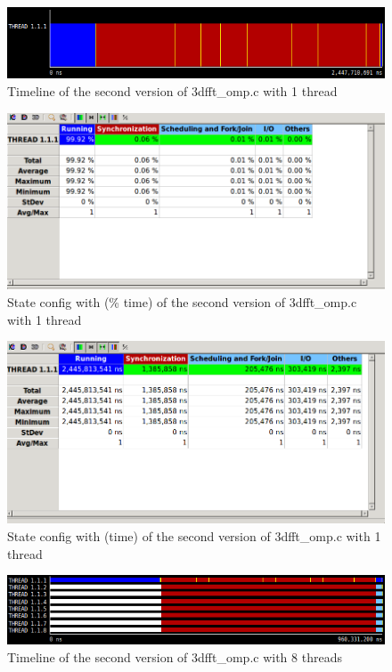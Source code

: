 \documentclass[12]{article}
\begin{document}
\bigskip

\begin{figure}[H]
\centering  
\includegraphics[scale=0.5]{images/improved_3dfft/1threadTimeline.PNG}
    \caption{Timeline of the second version of 3dfft\_omp.c with 1 thread}
\end{figure}

\begin{figure}[H]
\centering  
\includegraphics[scale=0.5]{images/improved_3dfft/1threadPercentage.PNG}
    \caption{State config with (\% time) of the second version of 3dfft\_omp.c with 1 thread}
\end{figure}

\begin{figure}[H]
\centering  
\includegraphics[scale=0.5]{images/improved_3dfft/1thread.PNG}
    \caption{State config with (time) of the second version of 3dfft\_omp.c with 1 thread}
\end{figure}
    

\begin{figure}[H]
\centering  
\includegraphics[scale=0.5]{images/improved_3dfft/8threadsTimeline.PNG}
    \caption{Timeline of the second version of 3dfft\_omp.c with 8 threads}
\end{figure}
    
\end{document}
